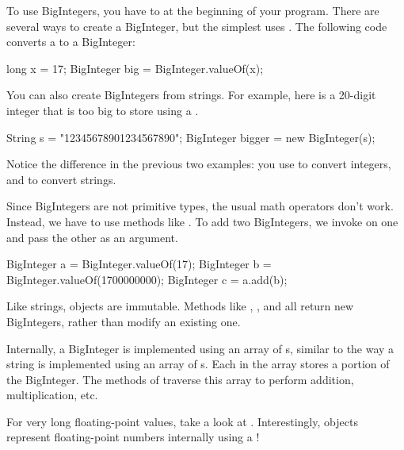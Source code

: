 

To use BigIntegers, you have to  at the beginning of your program.
There are several ways to create a BigInteger, but the simplest uses .
The following code converts a  to a BigInteger:

\begin{code}
long x = 17;
BigInteger big = BigInteger.valueOf(x);
\end{code}

You can also create BigIntegers from strings.
For example, here is a 20-digit integer that is too big to store using a .

\begin{code}
String s = "12345678901234567890";
BigInteger bigger = new BigInteger(s);
\end{code}

Notice the difference in the previous two examples: you use  to convert integers, and  to convert strings.

Since BigIntegers are not primitive types, the usual math operators don't work.
Instead, we have to use methods like .
To add two BigIntegers, we invoke  on one and pass the other as an argument.

\begin{code}
BigInteger a = BigInteger.valueOf(17);
BigInteger b = BigInteger.valueOf(1700000000);
BigInteger c = a.add(b);
\end{code}

Like strings,  objects are immutable.
Methods like , , and  all return new BigIntegers, rather than modify an existing one.

Internally, a BigInteger is implemented using an array of s, similar to the way a string is implemented using an array of s.
Each  in the array stores a portion of the BigInteger.
The methods of  traverse this array to perform addition, multiplication, etc.

For very long floating-point values, take a look at .
Interestingly,  objects represent floating-point numbers internally using a !



